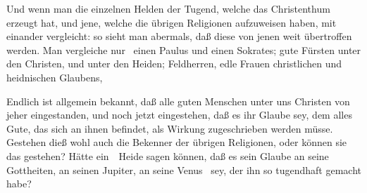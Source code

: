 \begin{aufza}
\begin{aufzb}
\item Und wenn man die einzelnen Helden der Tugend, welche das Christenthum erzeugt hat, und jene, welche die übrigen Religionen aufzuweisen haben, mit einander vergleicht: so sieht man abermals, daß diese von jenen weit übertroffen werden. Man vergleiche nur \zB\ einen Paulus und einen Sokrates; gute Fürsten unter den Christen, und unter den Heiden; Feldherren, edle Frauen christlichen und heidnischen Glaubens, \usw
\item Endlich ist allgemein bekannt, daß alle guten Menschen unter uns Christen von jeher eingestanden, und noch jetzt eingestehen, daß es ihr Glaube sey, dem alles Gute, das sich an ihnen befindet, als Wirkung zugeschrieben werden müsse. Gestehen dieß wohl auch die Bekenner der übrigen Religionen, oder können sie das gestehen? Hätte ein~\ Heide sagen können, daß es sein Glaube an seine Gottheiten, an seinen Jupiter, an seine Venus \usw\ sey, der ihn so tugendhaft gemacht habe?
\end{aufzb}
\end{aufza}

